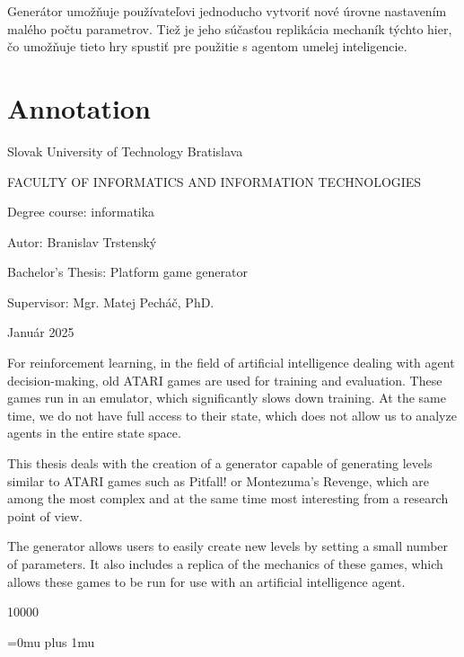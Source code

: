 \documentclass[11pt,slovak,a4paper]{article}
\begin{document}
Generátor umožňuje používateľovi jednoducho vytvoriť nové úrovne nastavením malého počtu parametrov. Tiež je jeho súčasťou replikácia mechaník týchto hier, čo umožňuje tieto hry spustiť pre použitie s agentom umelej inteligencie.

\newpage

\null \thispagestyle{empty}

\newpage

\section*{Annotation}

Slovak University of Technology Bratislava

FACULTY OF INFORMATICS AND INFORMATION TECHNOLOGIES


Degree course: \tab informatika

Autor: \tab Branislav Trstenský

Bachelor's Thesis: \tab Platform game generator

Supervisor: \tab Mgr. Matej Pecháč, PhD.

Január 2025

For reinforcement learning, in the field of artificial intelligence dealing with agent decision-making, old ATARI games are used for training and evaluation. These games run in an emulator, which significantly slows down training. At the same time, we do not have full access to their state, which does not allow us to analyze agents in the entire state space.

This thesis deals with the creation of a generator capable of generating levels similar to ATARI games such as Pitfall! or Montezuma's Revenge, which are among the most complex and at the same time most interesting from a research point of view.

The generator allows users to easily create new levels by setting a small number of parameters. It also includes a replica of the mechanics of these games, which allows these games to be run for use with an artificial intelligence agent.

\newpage

\null \thispagestyle{empty}

\newpage

\thispagestyle{plain}
\tableofcontents

\newpage

\null \thispagestyle{empty}

\newpage

\setcounter{page}{1}

 10000


\newpage

\Urlmuskip=0mu plus 1mu
\def\UrlBreaks{\do\/\do-}



\end{document}

